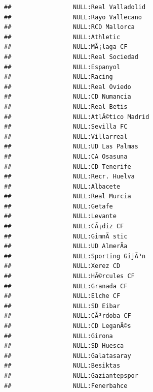 \documentclass{article}\usepackage[]{graphicx}\usepackage[]{color}
\makeatletter
\newenvironment{kframe}{%
 \def\at@end@of@kframe{}%
 \ifinner\ifhmode%
  \def\at@end@of@kframe{\end{minipage}}%
  \begin{minipage}{\columnwidth}%
 \fi\fi%
 \def\FrameCommand##1{\hskip\@totalleftmargin \hskip-\fboxsep
 \colorbox{shadecolor}{##1}\hskip-\fboxsep
     \hskip-\linewidth \hskip-\@totalleftmargin \hskip\columnwidth}%
 \MakeFramed {\advance\hsize-\width
   \@totalleftmargin\z@ \linewidth\hsize
   \@setminipage}}%
 {\par\unskip\endMakeFramed%
 \at@end@of@kframe}
\newenvironment{knitrout}{}{} %
\makeatother
\begin{document}
\begin{knitrout}
\begin{kframe}
\begin{verbatim}
##                 NULL:Real Valladolid                           
##                 NULL:Rayo Vallecano                            
##                 NULL:RCD Mallorca                              
##                 NULL:Athletic                                  
##                 NULL:MÃ¡laga CF                                
##                 NULL:Real Sociedad                             
##                 NULL:Espanyol                                  
##                 NULL:Racing                                    
##                 NULL:Real Oviedo                               
##                 NULL:CD Numancia                               
##                 NULL:Real Betis                                
##                 NULL:AtlÃ©tico Madrid                          
##                 NULL:Sevilla FC                                
##                 NULL:Villarreal                                
##                 NULL:UD Las Palmas                             
##                 NULL:CA Osasuna                                
##                 NULL:CD Tenerife                               
##                 NULL:Recr. Huelva                              
##                 NULL:Albacete                                  
##                 NULL:Real Murcia                               
##                 NULL:Getafe                                    
##                 NULL:Levante                                   
##                 NULL:CÃ¡diz CF                                 
##                 NULL:GimnÃ stic                                
##                 NULL:UD AlmerÃ­a                               
##                 NULL:Sporting GijÃ³n                           
##                 NULL:Xerez CD                                  
##                 NULL:HÃ©rcules CF                              
##                 NULL:Granada CF                                
##                 NULL:Elche CF                                  
##                 NULL:SD Eibar                                  
##                 NULL:CÃ³rdoba CF                               
##                 NULL:CD LeganÃ©s                               
##                 NULL:Girona                                    
##                 NULL:SD Huesca                                 
##                 NULL:Galatasaray                               
##                 NULL:Besiktas                                  
##                 NULL:Gaziantepspor                             
##                 NULL:Fenerbahce                                

\end{verbatim}
\end{kframe}
\end{knitrout}
\end{document}

